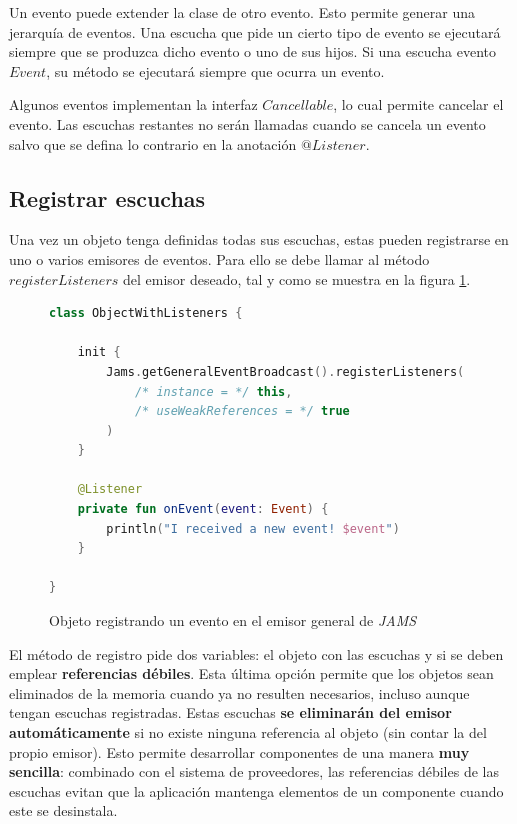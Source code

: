 Un evento puede extender la clase de otro evento.
Esto permite generar una jerarquía de eventos.
Una escucha que pide un cierto tipo de evento se ejecutará siempre
que se produzca dicho evento o uno de sus hijos.
Si una escucha  evento $Event$,
su método se ejecutará siempre que ocurra un evento.

Algunos eventos implementan la interfaz $Cancellable$, lo cual permite cancelar el evento.
Las escuchas restantes no serán llamadas cuando se cancela un evento salvo que se defina lo contrario
en la anotación $@Listener$.

\subsection{Registrar escuchas}\label{subsec:registrar-escuchas}

Una vez un objeto tenga definidas todas sus escuchas, estas
pueden registrarse en uno o varios emisores de eventos.
Para ello se debe llamar al método $registerListeners$ del
emisor deseado, tal y como se muestra en la figura \ref{fig:event-registration}.

\begin{figure}[h]
    \centering
    \begin{lstlisting}[frame=single,label={lst:event-registration-use},language=Kotlin]
class ObjectWithListeners {

    init {
        Jams.getGeneralEventBroadcast().registerListeners(
            /* instance = */ this,
            /* useWeakReferences = */ true
        )
    }

    @Listener
    private fun onEvent(event: Event) {
        println("I received a new event! $event")
    }

}
    \end{lstlisting}
    \caption{Objeto registrando un evento en el emisor general de \textit{JAMS}}
    \label{fig:event-registration}
\end{figure}

El método de registro pide dos variables: el objeto
con las escuchas y si se deben emplear \textbf{referencias débiles}.
Esta última opción permite que los objetos sean eliminados de la memoria
cuando ya no resulten necesarios, incluso aunque tengan escuchas registradas.
Estas escuchas \textbf{se eliminarán del emisor automáticamente} si no existe
ninguna referencia al objeto (sin contar la del propio emisor).
Esto permite desarrollar componentes de una manera \textbf{muy sencilla}:
combinado con el sistema de proveedores, las referencias débiles
de las escuchas evitan que la aplicación mantenga elementos de un
componente cuando este se desinstala.

